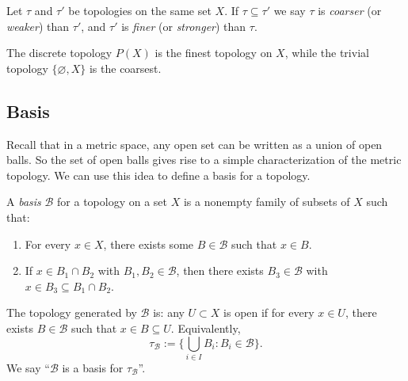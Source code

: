\begin{definition}
Let ${\tau}$ and ${\tau}'$ be topologies on the same set $X$. If ${\tau}\subseteq{\tau}'$ we say ${\tau}$ is \emph{coarser} (or \emph{weaker}) than ${\tau}'$, and ${\tau}'$ is \emph{finer} (or \emph{stronger}) than ${\tau}$.
\end{definition}

\begin{remark}
The discrete topology $P(X)$ is the finest topology on $X$, while the trivial topology $\{\varnothing,X\}$ is the coarsest.
\end{remark}




\subsection{Basis}

Recall that in a metric space, any open set can be written as a union of open balls. So the set of open balls gives rise to a simple characterization of the metric topology. We can use this idea to define a basis for a topology.

\begin{definition}[Basis]
A \emph{basis} $\mathcal{B}$ for a topology on a set $X$ is a nonempty family of subsets of $X$ such that:
\begin{enumerate}
  \item For every $x\in X$, there exists some $B\in\mathcal{B}$ such that $x\in B$.
  \item If $x\in B_1\cap B_2$ with $B_1,B_2\in\mathcal{B}$, then there exists $B_3\in\mathcal{B}$ with $x\in B_3\subseteq B_1\cap B_2$.
\end{enumerate}
The topology generated by $\mathcal{B}$ is: any $U\subset X$ is open if for every $x\in U$, there exists $B\in\mathcal{B}$ such that $x\in B\subseteq U$. Equivalently,
\[
{\tau}_{\mathcal{B}}:=\Big\{\bigcup_{i\in I} B_i : B_i\in\mathcal{B}\Big\}.
\]
We say  “$\mathcal{B}$ is a basis for ${\tau_\mathcal{B}}$”.
\end{definition}

\begin{center}
\end{center}

